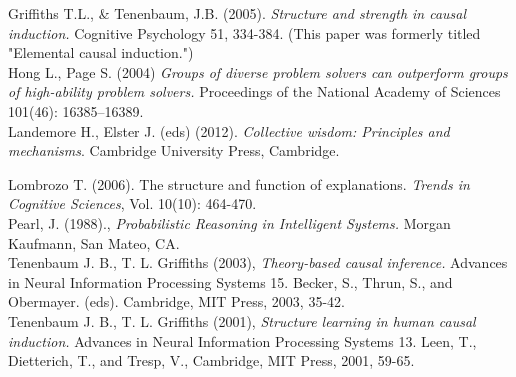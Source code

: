 \documentclass[12pt]{article}
\begin{document}
Griffiths T.L., \& Tenenbaum, J.B. (2005). \textit{Structure and strength in causal induction.} Cognitive Psychology 51, 334-384. (This paper was formerly titled "Elemental causal induction.")
\\


Hong L., Page S. (2004) \textit{Groups of diverse problem solvers can outperform groups of high-ability problem solvers.} Proceedings of the National Academy of Sciences 101(46): 16385–16389.
\\
Landemore H., Elster J. (eds) (2012). \textit{Collective wisdom: Principles and mechanisms}. Cambridge University Press, Cambridge.

Lombrozo T. (2006). The structure and function of explanations. \textit{Trends in Cognitive Sciences}, Vol. 10(10): 464-470.
\\

Pearl, J. (1988)., \textit{Probabilistic Reasoning in Intelligent Systems.} Morgan Kaufmann, San Mateo, CA.
\\

Tenenbaum J. B., T. L. Griffiths (2003), \textit{Theory-based causal inference.} Advances in Neural Information Processing Systems 15. Becker, S., Thrun, S., and Obermayer. (eds). Cambridge, MIT Press, 2003, 35-42.
\\

Tenenbaum J. B., T. L. Griffiths (2001), \textit{Structure learning in human causal induction.} Advances in Neural Information Processing Systems 13. Leen, T., Dietterich, T., and Tresp, V., Cambridge, MIT Press, 2001, 59-65.
\\
\end{document}
